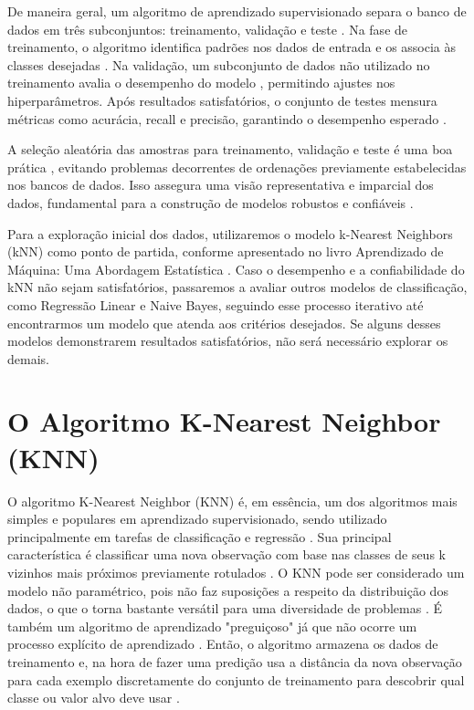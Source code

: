 De maneira geral, um algoritmo de aprendizado supervisionado separa o banco de dados em três subconjuntos: treinamento, validação e teste \cite{izbicki2020}. Na fase de treinamento, o algoritmo identifica padrões nos dados de entrada e os associa às classes desejadas \cite{izbicki2020}. Na validação, um subconjunto de dados não utilizado no treinamento avalia o desempenho do modelo \cite{izbicki2020}, permitindo ajustes nos hiperparâmetros. Após resultados satisfatórios, o conjunto de testes mensura métricas como acurácia, recall e precisão, garantindo o desempenho esperado \cite{izbicki2020}.

A seleção aleatória das amostras para treinamento, validação e teste é uma boa prática \cite{izbicki2020}, evitando problemas decorrentes de ordenações previamente estabelecidas nos bancos de dados. Isso assegura uma visão representativa e imparcial dos dados, fundamental para a construção de modelos robustos e confiáveis \cite{izbicki2020}.

Para a exploração inicial dos dados, utilizaremos o modelo k-Nearest Neighbors (kNN) como ponto de partida, conforme apresentado no livro Aprendizado de Máquina: Uma Abordagem Estatística . Caso o desempenho e a confiabilidade do kNN não sejam satisfatórios, passaremos a avaliar outros modelos de classificação, como Regressão Linear e Naive Bayes, seguindo esse processo iterativo até encontrarmos um modelo que atenda aos critérios desejados. Se alguns desses modelos demonstrarem resultados satisfatórios, não será necessário explorar os demais.

\section{O Algoritmo K-Nearest Neighbor (KNN)}
O algoritmo K-Nearest Neighbor (KNN) é, em essência, um dos algoritmos mais simples e populares em aprendizado supervisionado, sendo utilizado principalmente em tarefas de classificação e regressão \cite{zhang2016}. Sua principal característica é classificar uma nova observação com base nas classes de seus k vizinhos mais próximos previamente rotulados \cite{zhang2016}. O KNN pode ser considerado um modelo não paramétrico, pois não faz suposições a respeito da distribuição dos dados, o que o torna bastante versátil para uma diversidade de problemas \cite{zhang2016}. É também um algoritmo de aprendizado "preguiçoso" já que não ocorre um processo explícito de aprendizado \cite{zhang2016}.  Então, o algoritmo armazena os dados de treinamento e, na hora de fazer uma predição usa a distância da nova observação para cada exemplo discretamente do conjunto de treinamento para descobrir qual classe ou valor alvo deve usar \cite{zhang2016}.

